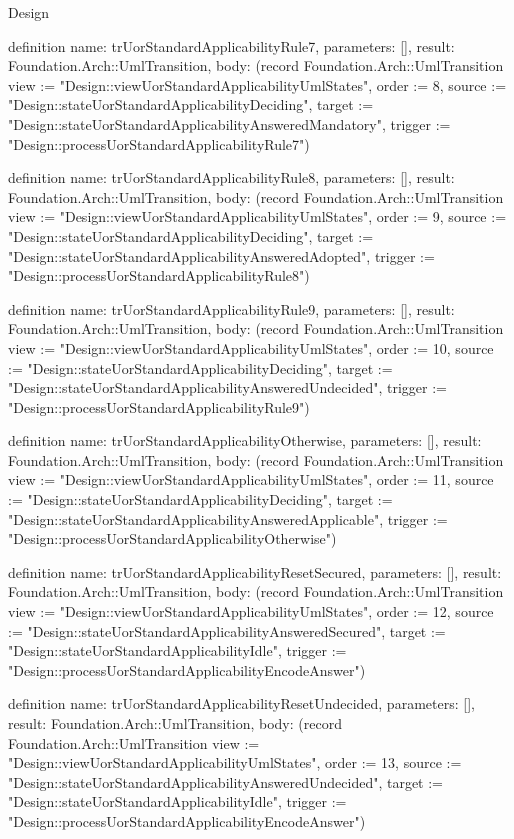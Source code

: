 \begin{lexlean}{Design}
\begin{semanticmodule}
definition{
  name: trUorStandardApplicabilityRule7,
  parameters: [],
  result: Foundation.Arch::UmlTransition,
  body: (record Foundation.Arch::UmlTransition {view := "Design::viewUorStandardApplicabilityUmlStates", order := 8, source := "Design::stateUorStandardApplicabilityDeciding", target := "Design::stateUorStandardApplicabilityAnsweredMandatory", trigger := "Design::processUorStandardApplicabilityRule7"})
}

definition{
  name: trUorStandardApplicabilityRule8,
  parameters: [],
  result: Foundation.Arch::UmlTransition,
  body: (record Foundation.Arch::UmlTransition {view := "Design::viewUorStandardApplicabilityUmlStates", order := 9, source := "Design::stateUorStandardApplicabilityDeciding", target := "Design::stateUorStandardApplicabilityAnsweredAdopted", trigger := "Design::processUorStandardApplicabilityRule8"})
}

definition{
  name: trUorStandardApplicabilityRule9,
  parameters: [],
  result: Foundation.Arch::UmlTransition,
  body: (record Foundation.Arch::UmlTransition {view := "Design::viewUorStandardApplicabilityUmlStates", order := 10, source := "Design::stateUorStandardApplicabilityDeciding", target := "Design::stateUorStandardApplicabilityAnsweredUndecided", trigger := "Design::processUorStandardApplicabilityRule9"})
}

definition{
  name: trUorStandardApplicabilityOtherwise,
  parameters: [],
  result: Foundation.Arch::UmlTransition,
  body: (record Foundation.Arch::UmlTransition {view := "Design::viewUorStandardApplicabilityUmlStates", order := 11, source := "Design::stateUorStandardApplicabilityDeciding", target := "Design::stateUorStandardApplicabilityAnsweredApplicable", trigger := "Design::processUorStandardApplicabilityOtherwise"})
}

definition{
  name: trUorStandardApplicabilityResetSecured,
  parameters: [],
  result: Foundation.Arch::UmlTransition,
  body: (record Foundation.Arch::UmlTransition {view := "Design::viewUorStandardApplicabilityUmlStates", order := 12, source := "Design::stateUorStandardApplicabilityAnsweredSecured", target := "Design::stateUorStandardApplicabilityIdle", trigger := "Design::processUorStandardApplicabilityEncodeAnswer"})
}

definition{
  name: trUorStandardApplicabilityResetUndecided,
  parameters: [],
  result: Foundation.Arch::UmlTransition,
  body: (record Foundation.Arch::UmlTransition {view := "Design::viewUorStandardApplicabilityUmlStates", order := 13, source := "Design::stateUorStandardApplicabilityAnsweredUndecided", target := "Design::stateUorStandardApplicabilityIdle", trigger := "Design::processUorStandardApplicabilityEncodeAnswer"})
}


\end{semanticmodule}
\end{lexlean}
